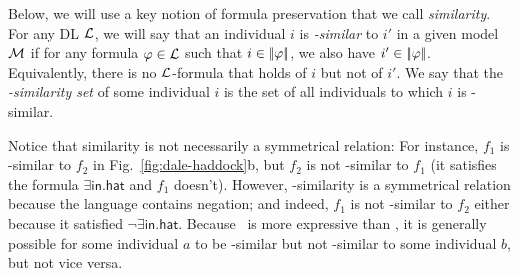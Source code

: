 Below, we will use a key notion of formula preservation that we call
\emph{similarity}.  For any DL $\mathcal{L}$, we will say that
an individual $i$ is \emph{\gL-similar} to $i'$ in a given model $\mathcal{M}$
if for any formula $\varphi \in \mathcal{L}$ such that $i \in
|\!|\varphi|\!|$, we also have $i' \in |\!|\varphi|\!|$.
Equivalently, there is no $\mathcal{L}$-formula that holds of $i$ but not of
$i'$.  We say that the \emph{\gL-similarity set} of some individual
$i$ is the set of all individuals to which $i$ is \gL-similar.

Notice that similarity is not necessarily a symmetrical relation: For
instance, $f_1$ is \el-similar to $f_2$ in
Fig.~\ref{fig:dale-haddock}b, but $f_2$ is not \el-similar to $f_1$
(it satisfies the formula $\exists \mathsf{in}.\mathsf{hat}$ and $f_1$
doesn't).  However, \alc-similarity is a symmetrical relation because
the language contains negation; and indeed, $f_1$ is not \alc-similar
to $f_2$ either because it satisfied $\neg \exists
\mathsf{in}.\mathsf{hat}$.  Because \alc\ is more expressive than \el,
it is generally possible for some individual $a$ to be \el-similar but
not \alc-similar to some individual $b$, but not vice versa.


